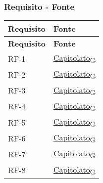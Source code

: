 \subsubsection{Requisito - Fonte}
\begin{longtable}{|>{\centering\arraybackslash}m{}|>{\centering\arraybackslash}m{}|}
	\hline
	\textbf{Requisito} & \textbf{Fonte}                                                                                                                                                                                                                                       \\\hline
	\endfirsthead
	\hline
	\textbf{Requisito} & \textbf{Fonte}                                                                                                                                                                                                                                       \\\hline
	\endhead
	RF-1            & \href{https://7last.github.io/docs/rtb/documentazione-interna/glossario\#capitolato}{Capitolato\textsubscript{G}} \\\hline
	RF-2            & \href{https://7last.github.io/docs/rtb/documentazione-interna/glossario\#capitolato}{Capitolato\textsubscript{G}} \\\hline
	RF-3            & \href{https://7last.github.io/docs/rtb/documentazione-interna/glossario\#capitolato}{Capitolato\textsubscript{G}} \\\hline
	RF-4            & \href{https://7last.github.io/docs/rtb/documentazione-interna/glossario\#capitolato}{Capitolato\textsubscript{G}} \\\hline
	RF-5            & \href{https://7last.github.io/docs/rtb/documentazione-interna/glossario\#capitolato}{Capitolato\textsubscript{G}} \\\hline
	RF-6            & \href{https://7last.github.io/docs/rtb/documentazione-interna/glossario\#capitolato}{Capitolato\textsubscript{G}} \\\hline
	RF-7            & \href{https://7last.github.io/docs/rtb/documentazione-interna/glossario\#capitolato}{Capitolato\textsubscript{G}} \\\hline
	RF-8            & \href{https://7last.github.io/docs/rtb/documentazione-interna/glossario\#capitolato}{Capitolato\textsubscript{G}} \\\hline

\end{longtable}
